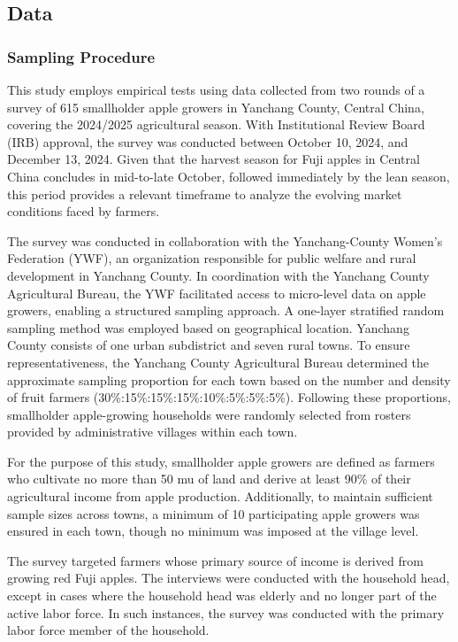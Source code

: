\documentclass[12pt]{article}
\begin{document}
\subsection{Data}
\subsubsection{Sampling Procedure}
\noindent This study employs empirical tests using data collected from two rounds of a survey of 615 smallholder apple growers in Yanchang County, Central China, covering the 2024/2025 agricultural season. With Institutional Review Board (IRB) approval, the survey was conducted between October 10, 2024, and December 13, 2024. Given that the harvest season for Fuji apples in Central China concludes in mid-to-late October, followed immediately by the lean season, this period provides a relevant timeframe to analyze the evolving market conditions faced by farmers.

The survey was conducted in collaboration with the Yanchang-County Women's Federation (YWF), an organization responsible for public welfare and rural development in Yanchang County. In coordination with the Yanchang County Agricultural Bureau, the YWF facilitated access to micro-level data on apple growers, enabling a structured sampling approach. A one-layer stratified random sampling method was employed based on geographical location. Yanchang County consists of one urban subdistrict and seven rural towns. To ensure representativeness, the Yanchang County Agricultural Bureau determined the approximate sampling proportion for each town based on the number and density of fruit farmers (30\%:15\%:15\%:15\%:10\%:5\%:5\%:5\%). Following these proportions, smallholder apple-growing households were randomly selected from rosters provided by administrative villages within each town.

For the purpose of this study, smallholder apple growers are defined as farmers who cultivate no more than 50 mu of land and derive at least 90\% of their agricultural income from apple production. Additionally, to maintain sufficient sample sizes across towns, a minimum of 10 participating apple growers was ensured in each town, though no minimum was imposed at the village level.

The survey targeted farmers whose primary source of income is derived from growing red Fuji apples. The interviews were conducted with the household head, except in cases where the household head was elderly and no longer part of the active labor force. In such instances, the survey was conducted with the primary labor force member of the household.
\end{document}
